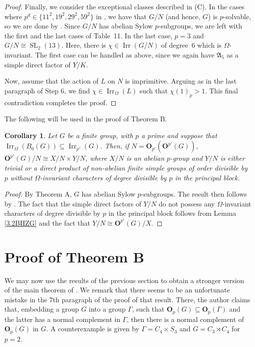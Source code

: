 \documentclass[12pt]{amsart}
\theoremstyle{theorem}
\newtheorem{cor}[teo]{Corollary}
\theoremstyle{definition}
\newcommand{\fA} {\mathfrak A}
\newcommand{\bO}{{\mathbf O}}
\newcommand{\Irr}{{\operatorname{Irr}}}
\newcommand{\SL}{\operatorname{SL}}
\begin{document}
\begin{proof}
		Finally, we consider the exceptional classes described in (C). In the cases
		where $p^d\in\{11^2,19^2,29^2,59^2\}$ in \cite[Table~11]{liebeck}, we have that
		$G/N$ (and hence, $G$) is $p$-solvable, so we are done by \cite[Theorem 3]{MMRSF}. Since $G/N$ has abelian
		Sylow $p$-subgroups, we are left with the first and the last cases of Table~11.
		In the last case, $p=3$ and $G/N\cong\SL_2(13)$. Here, there is
		$\chi\in\Irr(G/N)$ of degree~6 which is $\Omega$-invariant. The first case can be handled as above, since we again have $\fA_5$ as a simple direct factor of $Y/K$.
		\medskip
		
		Now, assume that the action of $L$ on $N$ is imprimitive. Arguing as in the
		last paragraph of Step 6, we find $\chi\in\Irr_\Omega(L)$ such that $\chi(1)_p>1$. This final contradiction completes the proof.
		
	\end{proof}
	
The following will be used in the proof of Theorem B. 	
	
	\begin{cor}
		\label{GritV1}
		Let $G$ be a finite group, with $p$ a prime and suppose that $\Irr_{\Omega}(B_0(G)) \subseteq \Irr_{p'}(G)$. Then, if $N = \bO_{p'}(\bO^{p'}(G))$, $\bO^{p'}(G)/N \cong X/N \times Y/N$, where $X/N$ is an abelian $p$-group and $Y/N$ is either trivial or a direct product of non-abelian finite simple groups of order divisible by $p$ without $\Omega$-invariant characters of degree divisible by $p$ in the principal block.
	\end{cor}
	
	\begin{proof}
		By Theorem A, $G$ has abelian Sylow $p$-subgroups. The result then follows by \cite[Theorem 4.1]{MinimalHeights}. The fact that the simple direct factors of $Y/N$ do not possess any $\Omega$-invariant characters of degree divisible by $p$ in the principal block follows from Lemma \ref{3.2BHZG} and the fact that $Y/N \cong \bO^{p'}(G)/X$.
	\end{proof}
	
	\medskip
	

	\section{Proof of Theorem B}
	
	We may now use the results of the previous section to obtain a stronger version of the main theorem of \cite{Grit}. We remark that there seems to be an unfortunate mistake in the 7th paragraph of the proof of that result. There, the author claims that, embedding a group $G$ into a group $\Gamma$, such that $\bO_p(G) \subseteq \bO_p(\Gamma)$ and the latter has a normal complement in $\Gamma$, then there is a normal complement of $\bO_p(G)$ in $G$. A counterexample is given by $\Gamma = C_4 \times S_3$ and $G = C_3 \rtimes C_4$ for $p = 2$.
	
\end{document}

